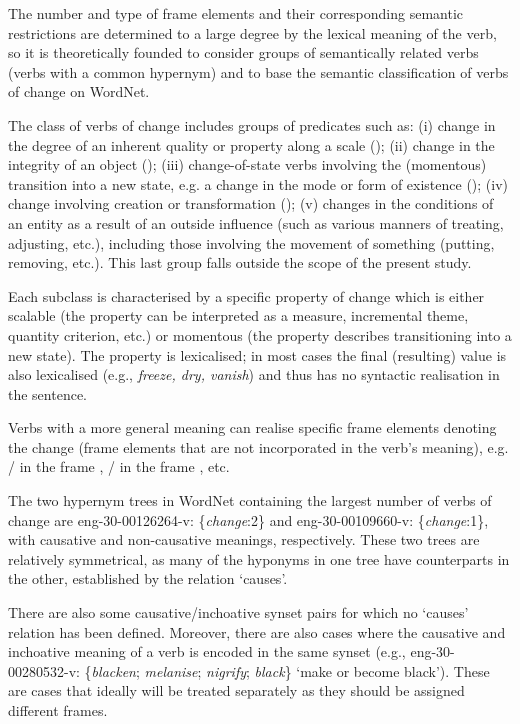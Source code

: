 \documentclass[output=paper,colorlinks,citecolor=brown]{langscibook}
\begin{document}
The number and type of frame elements and their corresponding semantic restrictions are determined to a large degree by the lexical meaning of the verb, so it is theoretically founded to consider groups of semantically related verbs (verbs with a common hypernym) and to base the semantic classification of verbs of change on WordNet.


The class of verbs of change includes groups of predicates such as: (i) change in the degree of an inherent quality or property along a scale (); (ii) change in the integrity of an object (); (iii) change-of-state verbs involving the (momentous) transition into a new state, e.g. a change in the mode or form of existence (); (iv) change involving creation or transformation (); (v) changes in the conditions of an entity as a result of an outside influence (such as various manners of treating, adjusting, etc.), including those involving the movement of something (putting, removing, etc.). This last group falls outside the scope of the present study.

Each subclass is characterised by a specific property of change which is either scalable (the property can be interpreted as a measure, incremental theme, quantity criterion, etc.) or momentous (the property describes transitioning into a new state). The property is lexicalised; in most cases the final (resulting) value is also lexicalised (e.g., \textit{freeze, dry, vanish}) and thus has no syntactic realisation in the sentence. 

Verbs with a more general meaning can realise specific frame elements denoting the change (frame elements that are not incorporated in the verb's meaning), e.g. \slash 
{} in the frame , \slash {} in the frame , etc.

The two hypernym trees in WordNet containing the largest number of verbs of change are eng-30-00126264-v: \{\textit{change}:2\} and eng-30-00109660-v: \{\textit{change}:1\}, with causative and non-causative meanings, respectively. These two trees are relatively symmetrical, as many of the hyponyms in one tree have counterparts in the other, established by the relation `causes'.

There are also some causative/inchoative synset pairs for which no `causes’ relation has been defined. Moreover, there are also cases where the causative and inchoative meaning of a verb is encoded in the same synset (e.g., eng-30-00280532-v: \{\textit{blacken}; \textit{melanise}; \textit{nigrify}; \textit{black}\} `make or become black'). These are cases that ideally will be treated separately as they should be assigned different frames.
\end{document}
